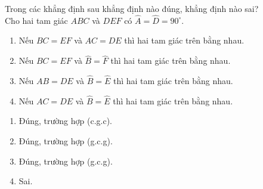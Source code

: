 \newpage
\btvn
\begin{vn}
	Trong các khẳng định sau khẳng định nào đúng, khẳng định nào sai?\\
	Cho hai tam giác $ABC$ và $DEF$ có $\widehat{A}=\widehat{D}=90^\circ$.
	\begin{enumerate}
		\item Nếu $BC=EF$ và $AC=DE$ thì hai tam giác trên bằng nhau.
		\item Nếu $BC=EF$ và $\widehat{B}=\widehat{F}$ thì hai tam giác trên bằng nhau.
		\item Nếu $AB=DE$ và $\widehat{B}=\widehat{E}$ thì hai tam giác trên bằng nhau.
		\item Nếu $AC=DE$ và $\widehat{B}=\widehat{E}$ thì hai tam giác trên bằng nhau.
	\end{enumerate}
	\loigiai
	{
	\begin{enumerate}
		\item Đúng, trường hợp (c.g.c).
		\item Đúng, trường hợp (g.c.g).
		\item Đúng, trường hợp (g.c.g).
		\item  Sai.
		\end{enumerate}
	}
\end{vn}

